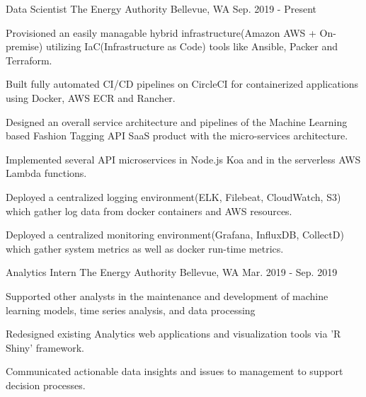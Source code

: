

\begin{cventries}

  \cventry
    {Data Scientist} %
    {The Energy Authority} %
    {Bellevue, WA} %
    {Sep. 2019 - Present} %
    {
      \begin{cvitems} %
        \item {Provisioned an easily managable hybrid infrastructure(Amazon AWS + On-premise) utilizing IaC(Infrastructure as Code) tools like Ansible, Packer and Terraform.}
        \item {Built fully automated CI/CD pipelines on CircleCI for containerized applications using Docker, AWS ECR and Rancher.}
        \item {Designed an overall service architecture and pipelines of the Machine Learning based Fashion Tagging API SaaS product with the micro-services architecture.}
        \item {Implemented several API microservices in Node.js Koa and in the serverless AWS Lambda functions.}
        \item {Deployed a centralized logging environment(ELK, Filebeat, CloudWatch, S3) which gather log data from docker containers and AWS resources.}
        \item {Deployed a centralized monitoring environment(Grafana, InfluxDB, CollectD) which gather system metrics as well as docker run-time metrics.}
      \end{cvitems}
    }

  \cventry
    {Analytics Intern} %
    {The Energy Authority} %
    {Bellevue, WA} %
    {Mar. 2019 - Sep. 2019} %
    {
      \begin{cvitems} %
        \item {Supported other analysts in the maintenance and development of machine learning models, time series analysis, and data processing}
        \item {Redesigned existing Analytics web applications and visualization tools via 'R Shiny' framework.}
        \item {Communicated actionable data insights and issues to management to support decision processes.}
      \end{cvitems}
    }


\end{cventries}
